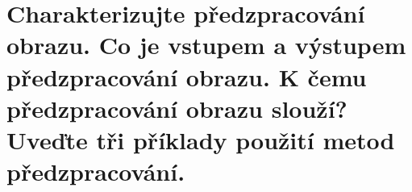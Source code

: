 \section{Charakterizujte předzpracování obrazu. Co je vstupem a výstupem předzpracování obrazu. K čemu předzpracování 
obrazu slouží? Uveďte tři příklady použití metod předzpracování.}